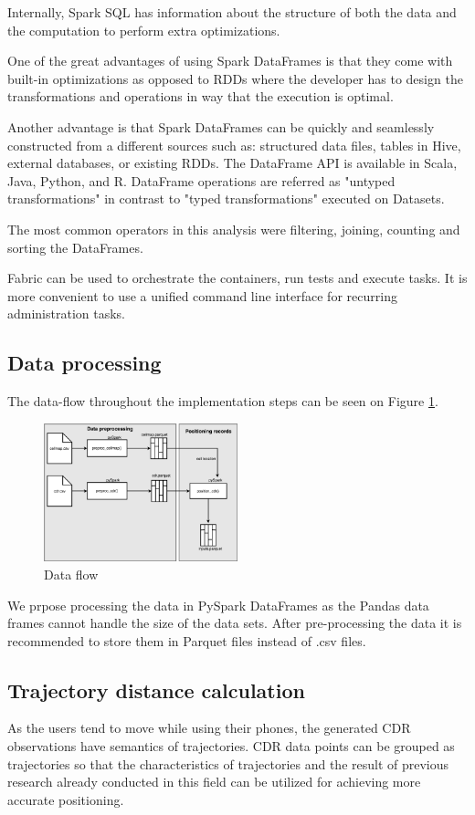 Internally, Spark SQL has information about the structure of both the data and the computation to perform extra optimizations. 

One of the great advantages of using Spark DataFrames is that they come with built-in optimizations as opposed to RDDs where the developer has to design the transformations and operations in way that the execution is optimal.

Another advantage is that Spark DataFrames can be quickly and seamlessly constructed from a different sources such as: structured data files, tables in Hive, external databases, or existing RDDs. The DataFrame API is available in Scala, Java, Python, and R. DataFrame operations are referred as "untyped transformations" in contrast to "typed transformations" executed on Datasets.\cite{spark-sql} 

The most common operators in this analysis were filtering, joining, counting and sorting the DataFrames.

Fabric can be used to orchestrate the containers, run tests and execute tasks. It is more convenient to use a unified command line interface for recurring administration tasks. \cite{fabric}

\subsection{Data processing}\label{sec:data-proc}
The data-flow throughout the implementation steps can be seen on Figure \ref{fig:data-flow}.
\begin{figure}[h]
    \centering
    \includegraphics[width=0.5\textwidth]{images/data-flow.png}
    \caption{Data flow}
    \label{fig:data-flow}
\end{figure}

We prpose processing the data in PySpark DataFrames as the Pandas data frames cannot handle the size of the data sets. After pre-processing the data it is recommended to store them in Parquet files instead of .csv files.

\subsection{Trajectory distance calculation}
As the users tend to move while using their phones, the generated CDR observations have semantics of trajectories. CDR data points can be grouped as trajectories so that the characteristics of trajectories and the result of previous research already conducted in this field can be utilized for achieving more accurate positioning.

